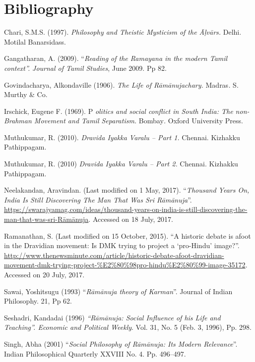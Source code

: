 \section*{Bibliography}

\begin{thebibliography}{99}
 Chari, S.M.S. (1997). \textit{Philosophy and Theistic Mysticism of the Āḷvārs.} Delhi. Motilal Banarsidass.

  Gangatharan, A. (2009). “\textit{Reading of the Ramayana in the modern Tamil context”.} \textit{Journal of Tamil Studies}, June 2009. Pp 82.

  Govindacharya, Alkondaville (1906). \textit{The Life of Rāmānujachary. }Madras\textit{.} S. Murthy \& Co.

  Irschick, Eugene F. (1969). P \textit{olitics and social conflict in South India: The non-Brahman Movement and Tamil Separatism. }Bombay\textit{. }Oxford University Press.

  Muthukumar, R. (2010). \textit{Dravida Iyakka Varalu – Part 1.} Chennai. Kizhakku Pathippagam.

  Muthukumar, R. (2010) \textit{Dravida Iyakka Varalu – Part 2. }Chennai. Kizhakku Pathippagam.

  Neelakandan, Aravindan. (Last modified on 1 May, 2017). “\textit{Thousand Years On, India Is Still Discovering The Man That Was Sri Rāmānuja}”. \url{https://swarajyamag.com/ideas/thousand-years-on-india-is-still-discovering-the-man-that-was-sri-Rāmānuja}. Accessed on 18 July, 2017.

  Ramanathan, S. (Last modified on 15 October, 2015). “A historic debate is afoot in the Dravidian movement: Is DMK trying to project a ‘pro-Hindu’ image?”. \url{http://www.thenewsminute.com/article/historic-debate-afoot-dravidian-movement-dmk-trying-project-%E2%80%98pro-hindu%E2%80%99-image-35172}. Accessed on 20 July, 2017.

  Sawai, Yoshitsugu (1993) “\textit{Rāmānuja theory of Karman}”. Journal of Indian Philosophy. 21, Pp 62.

  Seshadri, Kandadai (1996) \textit{“Rāmānuja: Social Influence of his Life and Teaching”. Economic and Political Weekly}. Vol. 31, No. 5 (Feb. 3, 1996), Pp. 298.

  Singh, Abha (2001) “\textit{Social Philosophy of Rāmānuja: Its Modern Relevance}”. Indian Philosophical Quarterly XXVIII No. 4. Pp. 496–497.


\end{thebibliography}
